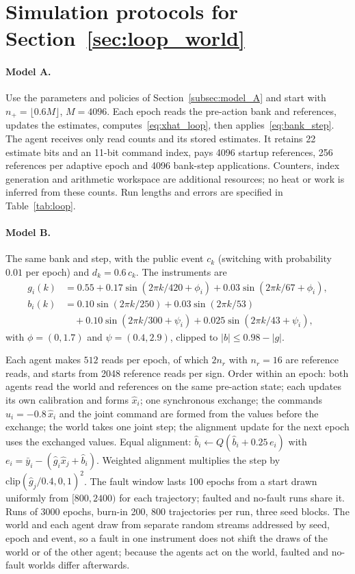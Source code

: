 \documentclass[12pt]{article}
\theoremstyle{definition}
\begin{document}


\section{Simulation protocols for Section~\ref{sec:loop_world}}\label{app:loop_protocol}

\paragraph{Model A.} Use the parameters and policies of Section~\ref{subsec:model_A} and start with $n_+=\lfloor0.6M\rfloor$, $M=4096$. Each epoch reads the pre-action bank and references, updates the estimates, computes~\eqref{eq:xhat_loop}, then applies~\eqref{eq:bank_step}. The agent receives only read counts and its stored estimates. It retains 22 estimate bits and an 11-bit command index, pays 4096 startup references, 256 references per adaptive epoch and 4096 bank-step applications. Counters, index generation and arithmetic workspace are additional resources; no heat or work is inferred from these counts. Run lengths and errors are specified in Table~\ref{tab:loop}.

\paragraph{Model B.} The same bank and step, with the public event $c_k$ (switching with probability $0.01$ per epoch) and $d_k=0.6\,c_k$. The instruments are
\begin{align*}
g_i(k)&=0.55+0.17\sin(2\pi k/420+\phi_i)+0.03\sin(2\pi k/67+\phi_i),\\
b_i(k)&=0.10\sin(2\pi k/250)+0.03\sin(2\pi k/53)\\
&\quad+0.10\sin(2\pi k/300+\psi_i)+0.025\sin(2\pi k/43+\psi_i),
\end{align*}
with $\phi=(0,1.7)$ and $\psi=(0.4,2.9)$, clipped to $|b|\le0.98-|g|$. \begin{sloppypar}Each agent makes $512$ reads per epoch, of which $2n_r$ with $n_r=16$ are reference reads, and starts from 2048 reference reads per sign. Order within an epoch: both agents read the world and references on the same pre-action state; each updates its own calibration and forms $\hat x_i$; one synchronous exchange; the commands $u_i=-0.8\,\hat x_i$ and the joint command are formed from the values before the exchange; the world takes one joint step; the alignment update for the next epoch uses the exchanged values. Equal alignment: $\hat b_i\leftarrow Q(\hat b_i+0.25\,e_i)$ with $e_i=\bar y_i-(\hat g_i\hat x_j+\hat b_i)$. Weighted alignment multiplies the step by $\mathrm{clip}(\hat g_j/0.4,0,1)^2$. The fault window lasts 100 epochs from a start drawn uniformly from $[800,2400)$ for each trajectory; faulted and no-fault runs share it. Runs of 3000 epochs, burn-in 200, 800 trajectories per run, three seed blocks. The world and each agent draw from separate random streams addressed by seed, epoch and event, so a fault in one instrument does not shift the draws of the world or of the other agent; because the agents act on the world, faulted and no-fault worlds differ afterwards.\end{sloppypar}
\end{document}
